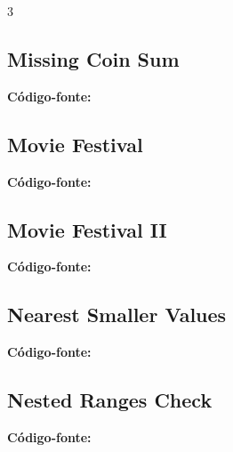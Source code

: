 \documentclass[8pt]{extarticle}
\begin{document}
\begin{multicols*}{3}
\subsection{Missing Coin Sum}
\begin{caixaenunciado}

\end{caixaenunciado}
\vspace{0.3cm}
\noindent\textbf{Código-fonte:}


\subsection{Movie Festival}
\begin{caixaenunciado}

\end{caixaenunciado}
\vspace{0.3cm}
\noindent\textbf{Código-fonte:}


\subsection{Movie Festival II}
\begin{caixaenunciado}

\end{caixaenunciado}
\vspace{0.3cm}
\noindent\textbf{Código-fonte:}


\subsection{Nearest Smaller Values}
\begin{caixaenunciado}

\end{caixaenunciado}
\vspace{0.3cm}
\noindent\textbf{Código-fonte:}


\subsection{Nested Ranges Check}
\begin{caixaenunciado}

\end{caixaenunciado}
\vspace{0.3cm}
\noindent\textbf{Código-fonte:}



\end{multicols*}
\end{document}
